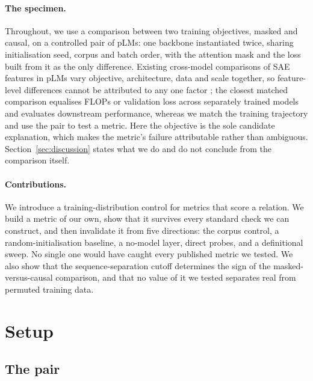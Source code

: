 \documentclass{article} %
\begin{document}
\paragraph{The specimen.} Throughout, we use a comparison between two training objectives,
masked and causal, on a controlled pair of pLMs: one backbone instantiated twice, sharing
initialisation seed, corpus and batch order, with the attention mask and the loss built from it
as the only difference. Existing cross-model comparisons of SAE features in pLMs vary objective,
architecture, data and scale together, so feature-level differences cannot be attributed to any
one factor \citep{gao2026structural}; the closest matched comparison equalises FLOPs or
validation loss across separately trained models \citep[Appendix~D]{cheng2024compute} and
evaluates downstream performance, whereas we match the training trajectory and use the pair to
test a metric. Here the objective is the sole candidate explanation, which makes the metric's
failure attributable rather than ambiguous. Section~\ref{sec:discussion} states what we do and do
not conclude from the comparison itself.

\paragraph{Contributions.} We introduce a training-distribution control for metrics that score a
relation. We build a metric of our own, show that it survives every standard check we can
construct, and then invalidate it from five directions: the corpus control, a random-initialisation
baseline, a no-model layer, direct probes, and a definitional sweep. No single one would have
caught every published metric we tested. We also show that the sequence-separation cutoff
determines the sign of the masked-versus-causal comparison, and that no value of it we tested
separates real from permuted training data.

\section{Setup}

\subsection{The pair}
\label{sec:pair}
\end{document}
